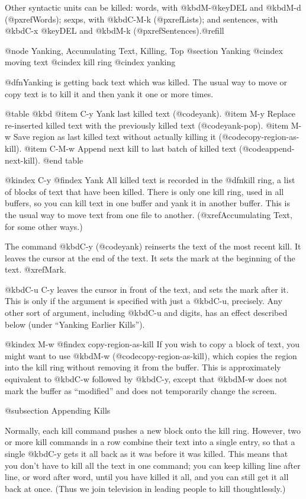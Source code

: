 {{{{{{{  Other syntactic units can be killed: words, with @kbd{M-@key{DEL}} and
@kbd{M-d} (@pxref{Words}); sexps, with @kbd{C-M-k} (@pxref{Lists}); and
sentences, with @kbd{C-x @key{DEL}} and @kbd{M-k}
(@pxref{Sentences}).@refill

@node Yanking, Accumulating Text, Killing, Top
@section Yanking
@cindex moving text
@cindex kill ring
@cindex yanking

  @dfn{Yanking} is getting back text which was killed.  The usual way to
move or copy text is to kill it and then yank it one or more times.

@table @kbd
@item C-y
Yank last killed text (@code{yank}).
@item M-y
Replace re-inserted killed text with the previously killed text
(@code{yank-pop}).
@item M-w
Save region as last killed text without actually killing it
(@code{copy-region-as-kill}).
@item C-M-w
Append next kill to last batch of killed text (@code{append-next-kill}).
@end table

@kindex C-y
@findex Yank
  All killed text is recorded in the @dfn{kill ring}, a list of blocks of
text that have been killed.  There is only one kill ring, used in all
buffers, so you can kill text in one buffer and yank it in another buffer.
This is the usual way to move text from one file to another.
(@xref{Accumulating Text}, for some other ways.)

  The command @kbd{C-y} (@code{yank}) reinserts the text of the most recent
kill.  It leaves the cursor at the end of the text.  It sets the mark at
the beginning of the text.  @xref{Mark}.

  @kbd{C-u C-y} leaves the cursor in front of the text, and sets the mark
after it.  This is only if the argument is specified with just a @kbd{C-u},
precisely.  Any other sort of argument, including @kbd{C-u} and digits, has
an effect described below (under ``Yanking Earlier Kills'').

@kindex M-w
@findex copy-region-as-kill
  If you wish to copy a block of text, you might want to use @kbd{M-w}
(@code{copy-region-as-kill}), which copies the region into the kill ring
without removing it from the buffer.  This is approximately equivalent to
@kbd{C-w} followed by @kbd{C-y}, except that @kbd{M-w} does not mark the
buffer as ``modified'' and does not temporarily change the screen.

@subsection Appending Kills

  Normally, each kill command pushes a new block onto the kill ring.
However, two or more kill commands in a row combine their text into a
single entry, so that a single @kbd{C-y} gets it all back as it was before
it was killed.  This means that you don't have to kill all the text in one
command; you can keep killing line after line, or word after word, until
you have killed it all, and you can still get it all back at once.  (Thus
we join television in leading people to kill thoughtlessly.)

}}}}}}}
